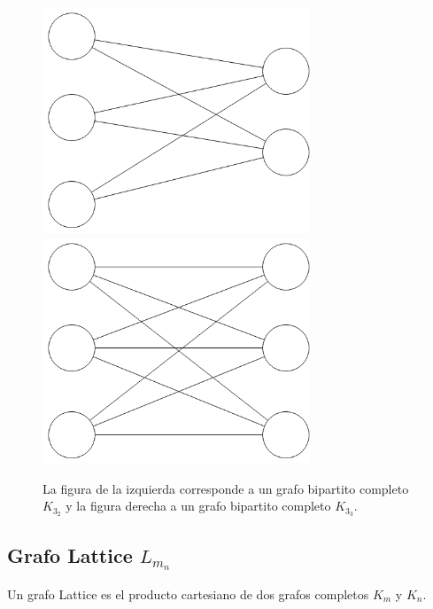 \begin{figure}[H]
\includegraphics[width=80mm]{K3_2.png}
\includegraphics[width=80mm]{K3_3.png}
\caption{La figura de la izquierda corresponde a un grafo bipartito completo $K_3_2$ y la figura derecha a un grafo bipartito completo $K_3_3$.}
\label{overflow}
\end{figure}


\subsection{Grafo Lattice $L_m_n$}
Un grafo Lattice es el producto cartesiano de dos grafos completos $K_m$ y $K_n$.

